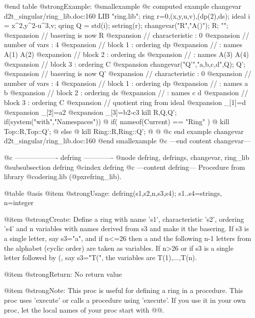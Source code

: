 @end table
@strong{Example:}
@smallexample
@c computed example changevar d2t_singular/ring_lib.doc:160 
LIB "ring.lib";
ring r=0,(x,y,u,v),(dp(2),ds);
ideal i = x^2,y^2-u^3,v;
qring Q = std(i);
setring(r);
changevar("R","A()"); R; "";
@expansion{} // basering is now R
@expansion{} //   characteristic : 0
@expansion{} //   number of vars : 4
@expansion{} //        block   1 : ordering dp
@expansion{} //                  : names    A(1) A(2) 
@expansion{} //        block   2 : ordering ds
@expansion{} //                  : names    A(3) A(4) 
@expansion{} //        block   3 : ordering C
@expansion{} 
changevar("Q'","a,b,c,d",Q); Q';
@expansion{} // basering is now Q'
@expansion{} //   characteristic : 0
@expansion{} //   number of vars : 4
@expansion{} //        block   1 : ordering dp
@expansion{} //                  : names    a b 
@expansion{} //        block   2 : ordering ds
@expansion{} //                  : names    c d 
@expansion{} //        block   3 : ordering C
@expansion{} // quotient ring from ideal
@expansion{} _[1]=d
@expansion{} _[2]=a2
@expansion{} _[3]=b2-c3
kill R,Q,Q';
if(system("with","Namespaces")) @{
if( nameof(Current) == "Ring" ) @{
kill Top::R,Top::Q';
@} else @{
kill Ring::R,Ring::Q';
@}
@}
@c end example changevar d2t_singular/ring_lib.doc:160
@end smallexample
@c ---end content changevar---

@c ------------------- defring -------------
@node defring, defrings, changevar, ring_lib
@subsubsection defring
@cindex defring
@c ---content defring---
Procedure from library @code{ring.lib} (@pxref{ring_lib}).

@table @asis
@item @strong{Usage:}
defring(s1,s2,n,s3,s4); s1..s4=strings, n=integer

@item @strong{Create:}
Define a ring with name 's1', characteristic 's2', ordering 's4' and
n variables with names derived from s3 and make it the basering.
If s3 is a single letter, say s3="a", and if n<=26 then a and the
following n-1 letters from the alphabet (cyclic order) are taken as
variables. If n>26 or if s3 is a single letter followed by (, say
s3="T(", the variables are T(1),...,T(n).

@item @strong{Return:}
No return value

@item @strong{Note:}
This proc is useful for defining a ring in a procedure.
This proc uses 'execute' or calls a procedure using 'execute'.
If you use it in your own proc, let the local names of your proc
start with @@.

